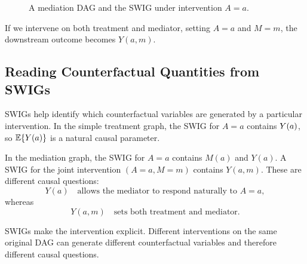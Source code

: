 \begin{figure}[H]
\centering
{}
\caption{A mediation DAG and the SWIG under intervention $A=a$.}
\end{figure}

If we intervene on both treatment and mediator, setting $A=a$ and $M=m$, the downstream outcome becomes $Y(a,m)$.

\subsection{Reading Counterfactual Quantities from SWIGs}

SWIGs help identify which counterfactual variables are generated by a particular intervention. In the simple treatment graph, the SWIG for $A=a$ contains $Y(a)$, so $\mathbb{E}\{Y(a)\}$ is a natural causal parameter.

In the mediation graph, the SWIG for $A=a$ contains $M(a)$ and $Y(a)$. A SWIG for the joint intervention $(A=a,M=m)$ contains $Y(a,m)$. These are different causal questions:
\[
Y(a) \quad\text{allows the mediator to respond naturally to } A=a,
\]
whereas
\[
Y(a,m) \quad\text{sets both treatment and mediator}.
\]

\begin{keyidea}
SWIGs make the intervention explicit. Different interventions on the same original DAG can generate different counterfactual variables and therefore different causal questions.
\end{keyidea}
